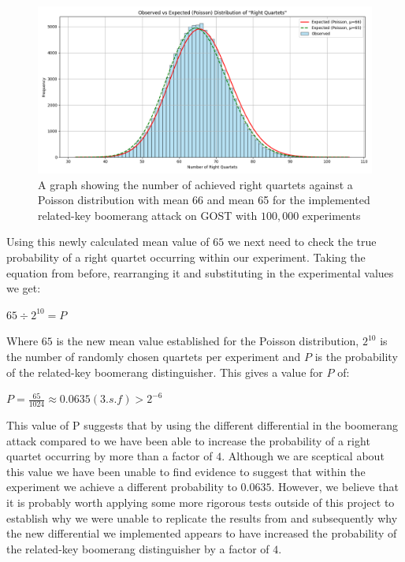 \documentclass[10pt,journal,compsoc]{IEEEtran}
\begin{document}
\begin{figure}[hbt!]
    \centering
    \includegraphics[width=\linewidth]{Figures/verBoomGraph-100k.png}
    \caption{A graph showing the number of achieved right quartets against a Poisson distribution with mean 66 and mean 65 for the implemented related-key boomerang attack on GOST with \(100,000\) experiments}
    \label{fig:verboomg-100k}
\end{figure}

Using this newly calculated mean value of \(65\) we next need to check the true probability of a right quartet occurring within our experiment. Taking the equation from before, rearranging it and substituting in the experimental values we get:

\begin{center}
    \(65 \div 2^{10} = P\)
\end{center}
Where \(65\) is the new mean value established for the Poisson distribution, \(2^{10}\) is the number of randomly chosen quartets per experiment and \(P\) is the probability of the related-key boomerang distinguisher. This gives a value for \(P\) of:

\begin{center}
    \(P = \frac{65}{1024} \approx 0.0635 (3.s.f) > 2^{-6}\)
\end{center}

This value of P suggests that by using the different differential in the boomerang attack compared to \cite{cryptoeprint:2010/111} we have been able to increase the probability of a right quartet occurring by more than a factor of \(4\). Although we are sceptical about this value we have been unable to find evidence to suggest that within the experiment we achieve a different probability to \(0.0635\). However, we believe that it is probably worth applying some more rigorous tests outside of this project to establish why we were unable to replicate the results from \cite{cryptoeprint:2010/111} and subsequently why the new differential we implemented appears to have increased the probability of the related-key boomerang distinguisher by a factor of \(4\).
 
\end{document}
